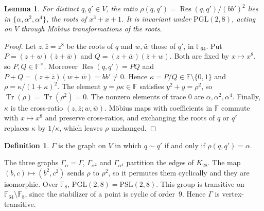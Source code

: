 \documentclass[11pt,a4paper]{article}
\newtheorem{lemma}[theorem]{Lemma}
\theoremstyle{definition}
\newtheorem{definition}[theorem]{Definition}
\newcommand{\F}{\mathbb{F}}
\newcommand{\Tr}{\operatorname{Tr}}
\newcommand{\Res}{\operatorname{Res}}
\newcommand{\PSL}{\mathrm{PSL}}
\newcommand{\PGL}{\mathrm{PGL}}
\begin{document}
\begin{lemma}\label{lem:rho}
For distinct $q,q'\in V$, the ratio $\rho(q,q')=\Res(q,q')/(bb')^2$ lies in
$\{\alpha,\alpha^2,\alpha^4\}$, the roots of $x^3+x+1$. It is invariant under
$\PGL(2,8)$, acting on $V$ through Möbius transformations of the roots.
\end{lemma}

\begin{proof}
Let $z,\bar z=z^8$ be the roots of $q$ and $w,\bar w$ those of $q'$, in
$\F_{64}$. Put $P=(z+w)(\bar z+\bar w)$ and $Q=(z+\bar w)(\bar z+w)$. Both are
fixed by $x\mapsto x^8$, so $P,Q\in\F^\times$. Moreover $\Res(q,q')=PQ$ and
$P+Q=(z+\bar z)(w+\bar w)=bb'\neq0$. Hence $\kappa=P/Q\in\F\setminus\{0,1\}$
and $\rho=\kappa/(1+\kappa)^2$. The element $y=\rho\kappa\in\F$ satisfies
$y^2+y=\rho^2$, so $\Tr(\rho)=\Tr(\rho^2)=0$. The nonzero elements of trace
$0$ are $\alpha,\alpha^2,\alpha^4$. Finally, $\kappa$ is the cross-ratio
$(z,\bar z;w,\bar w)$. Möbius maps with coefficients in $\F$ commute with
$x\mapsto x^8$ and preserve cross-ratios, and exchanging the roots of $q$ or
$q'$ replaces $\kappa$ by $1/\kappa$, which leaves $\rho$ unchanged.
\end{proof}

\begin{definition}
$\Gamma$ is the graph on $V$ in which $q\sim q'$ if and only if $\rho(q,q')=\alpha$.
\end{definition}

The three graphs $\Gamma_{\alpha}=\Gamma$, $\Gamma_{\alpha^2}$ and
$\Gamma_{\alpha^4}$ partition the edges of $K_{28}$. The map
$(b,c)\mapsto(b^2,c^2)$ sends $\rho$ to $\rho^2$, so it permutes them
cyclically and they are isomorphic. Over $\F_8$, $\PGL(2,8)=\PSL(2,8)$. This
group is transitive on $\F_{64}\setminus\F_8$, since the stabilizer of a point
is cyclic of order~9. Hence $\Gamma$ is vertex-transitive.
\end{document}
